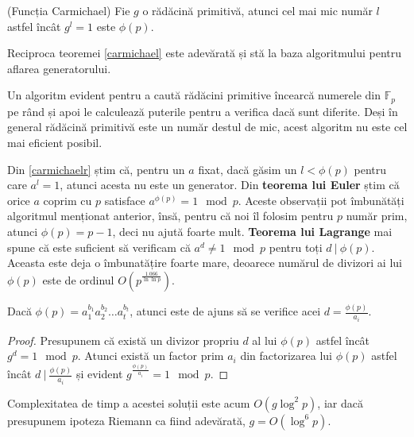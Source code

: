\begin{thm}
  \label{carmichael}
  (Funcția Carmichael) Fie $g$ o rădăcină primitivă, atunci cel mai mic număr $l$ astfel încât $g^{l} = 1$ este $\phi(p)$.
\end{thm}

\begin{thm}
  \label{carmichaelr}
  Reciproca teoremei \ref{carmichael} este adevărată și stă la baza algoritmului pentru aflarea generatorului.
\end{thm}

Un algoritm evident pentru a caută rădăcini primitive încearcă numerele din $\mathbb{F}_{p}$ pe rând și apoi le calculează
puterile pentru a verifica dacă sunt diferite. Deși în general rădăcină primitivă este un număr destul de mic, acest algoritm
nu este cel mai eficient posibil.

Din \ref{carmichaelr} știm că, pentru un $a$ fixat, dacă găsim un $l < \phi(p)$ pentru care $a^{l} = 1$, atunci acesta nu este un
generator. Din \textbf{teorema lui Euler} știm că orice $a$ coprim cu $p$ satisface $a^{\phi(p)} = 1 \mod p$. Aceste observații pot
îmbunătăți algoritmul menționat anterior, însă, pentru că noi îl folosim pentru $p$ număr prim, atunci $\phi(p) = p - 1$, deci nu
ajută foarte mult. \textbf{Teorema lui Lagrange} mai spune că este suficient să verificam că $a^{d} \neq 1 \mod p$ pentru toți $d \ |\ \phi(p)$.
Aceasta este deja o îmbunatățire foarte mare, deoarece numărul de divizori ai lui $\phi(p)$ este de ordinul $O(p^{\frac{1.066}{\ln \ln p}})$.

Dacă $\phi(p) = a_{1}^{b_{1}} a_{2}^{b_{2}} \ldots a_{t}^{b_{t}}$, atunci este de ajuns să se verifice acei $d = \frac{\phi(p)}{a_{i}}$.

\begin{proof}
  Presupunem că există un divizor propriu $d$ al lui $\phi(p)$ astfel încât $g^{d} = 1 \mod p$. Atunci există un factor prim $a_{i}$
  din factorizarea lui $\phi(p)$ astfel încât $d \ | \ \frac{\phi(p)}{a_{i}}$ și evident $g^{\frac{\phi(p)}{a_{i}}} = 1 \mod p$.
\end{proof}

Complexitatea de timp a acestei soluții este acum $O(g \log^{2} p)$, iar dacă presupunem ipoteza Riemann ca fiind adevărată, $g = O(\log^{6} p)$.
